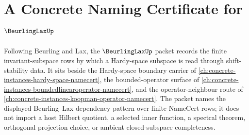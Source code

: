 \chapter{A Concrete Naming Certificate for $\BeurlingLaxUp$}
\label{ch:concrete-instances-beurling-lax-namecert}

Following Beurling and Lax, the $\BeurlingLaxUp$ packet records the finite invariant-subspace rows by which a Hardy-space subspace is read through shift-stability data. It sits beside the Hardy-space boundary carrier of \autoref{ch:concrete-instances-hardy-space-namecert}, the bounded-operator surface of \autoref{ch:concrete-instances-boundedlinearoperator-namecert}, and the operator-neighbour route of \autoref{ch:concrete-instances-koopman-operator-namecert}. The packet names the displayed Beurling--Lax dependency pattern over finite NameCert rows; it does not import a host Hilbert quotient, a selected inner function, a spectral theorem, orthogonal projection choice, or ambient closed-subspace completeness.

